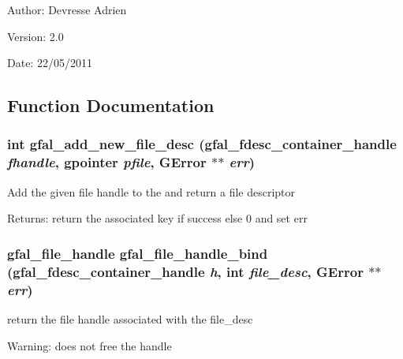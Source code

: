\begin{Desc}
\item[Author:]Devresse Adrien \end{Desc}
\begin{Desc}
\item[Version:]2.0 \end{Desc}
\begin{Desc}
\item[Date:]22/05/2011 \end{Desc}


\subsection{Function Documentation}
\subsubsection{\setlength{\rightskip}{0pt plus 5cm}int gfal\_\-add\_\-new\_\-file\_\-desc (gfal\_\-fdesc\_\-container\_\-handle {\em fhandle}, gpointer {\em pfile}, GError $\ast$$\ast$ {\em err})}\label{gfal__common__filedescriptor_8h_8ab30d677c0c3d4a635a35c395524fea}


Add the given file handle to the and return a file descriptor \begin{Desc}
\item[Returns:]return the associated key if success else 0 and set err \end{Desc}
\subsubsection{\setlength{\rightskip}{0pt plus 5cm}gfal\_\-file\_\-handle gfal\_\-file\_\-handle\_\-bind (gfal\_\-fdesc\_\-container\_\-handle {\em h}, int {\em file\_\-desc}, GError $\ast$$\ast$ {\em err})}\label{gfal__common__filedescriptor_8h_b1a9b764baa7c997a354d18bbe43e2cb}


return the file handle associated with the file\_\-desc \begin{Desc}
\item[Warning:]does not free the handle \end{Desc}
